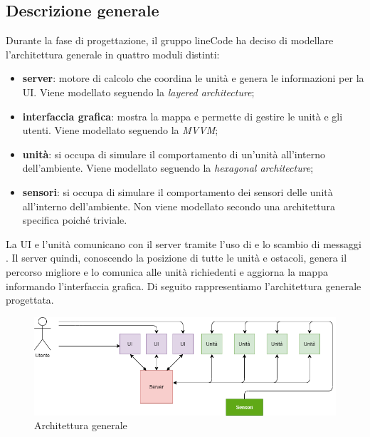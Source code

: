 \subsection{Descrizione generale}
Durante la fase di progettazione, il gruppo lineCode ha deciso di modellare l'architettura generale in quattro moduli distinti:
\begin{itemize}
	\item \textbf{server}: motore di calcolo che coordina le unità e genera le informazioni per la UI. Viene modellato seguendo la \textit{layered architecture};
	\item \textbf{interfaccia grafica}: mostra la mappa e permette di gestire le unità e gli utenti. Viene modellato seguendo la \textit{MVVM};
	\item \textbf{unità}: si occupa di simulare il comportamento di un'unità all'interno dell'ambiente. Viene modellato seguendo la \textit{hexagonal architecture};
	\item \textbf{sensori}: si occupa di simulare il comportamento dei sensori delle unità all'interno dell'ambiente. Non viene modellato secondo una architettura specifica poiché triviale.
\end{itemize}
La UI e l'unità comunicano con il server tramite l'uso di  e lo scambio di messaggi . Il server quindi, conoscendo la posizione di tutte le unità e ostacoli, genera il percorso migliore e lo comunica alle unità richiedenti e aggiorna la mappa informando l'interfaccia grafica. 
Di seguito rappresentiamo l'architettura generale progettata. 

\begin{figure}[H]
	\centering
	\includegraphics[width=16cm]{img/arch_generale.png}
	\caption{Architettura generale}
\end{figure}
